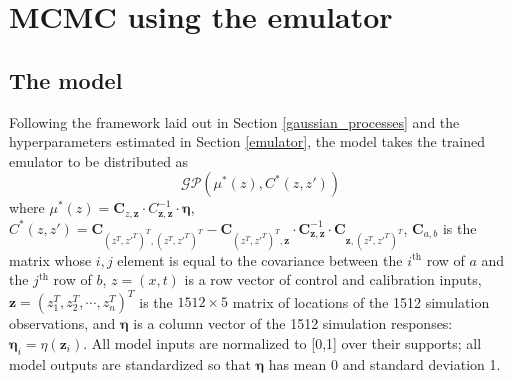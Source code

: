 \documentclass{article}
\begin{document}
\section{MCMC using the emulator}\label{MCMC}


\subsection{The model}
Following the framework laid out in Section \ref{gaussian_processes} and the hyperparameters estimated in Section \ref{emulator}, the model takes the trained emulator to be distributed as
\begin{equation}\label{posterior_GP}
\mathcal {GP}\left(\mu^*(z), C^*(z,z')\right)
\end{equation}
where $\mu^*(z) = \mathbf C_{z,\mathbf z} \cdot C_{\mathbf z,\mathbf z}^{-1} \cdot \boldsymbol \eta$, $C^*(z,z') = \mathbf C_{(z^T,z'^T)^T,(z^T,z'^T)^T} - \mathbf C_{(z^T,z'^T)^T,\mathbf z}\cdot \mathbf C_{\mathbf z,\mathbf z}^{-1} \cdot \mathbf C_{\mathbf z,(z^T,z'^T)^T}$, $\mathbf C_{a,b}$ is the matrix whose $i,j$ element is equal to the covariance between the $i^{\text{th}}$ row of $a$ and the $j^{\text{th}}$ row of $b$, $z=(x,t)$ is a row vector of control and calibration inputs, $\mathbf z=(z_1^T,z_2^T,\cdots,z_n^T)^T$ is the $1512\times5$ matrix of locations of the 1512 simulation observations, and $\boldsymbol\eta$ is a column vector of the 1512 simulation responses: $\boldsymbol\eta_i=\eta(\mathbf z_i)$. All model inputs are normalized to [0,1] over their supports; all model outputs are standardized so that $\boldsymbol\eta$ has mean 0 and standard deviation 1.
\end{document}
